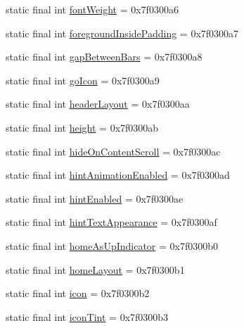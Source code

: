 \begin{DoxyCompactItemize}
\item 
static final int \mbox{\hyperlink{classandroid_1_1support_1_1design_1_1_r_1_1attr_a6a55f3eadb00895d0383f5379ef0d285}{font\+Weight}} = 0x7f0300a6
\item 
static final int \mbox{\hyperlink{classandroid_1_1support_1_1design_1_1_r_1_1attr_a133378181d31801943cf01d474253db0}{foreground\+Inside\+Padding}} = 0x7f0300a7
\item 
static final int \mbox{\hyperlink{classandroid_1_1support_1_1design_1_1_r_1_1attr_af5aa83bca46ec78627ca7af277ace09a}{gap\+Between\+Bars}} = 0x7f0300a8
\item 
static final int \mbox{\hyperlink{classandroid_1_1support_1_1design_1_1_r_1_1attr_ab0832bfcb7a264b7f160a92f19c26514}{go\+Icon}} = 0x7f0300a9
\item 
static final int \mbox{\hyperlink{classandroid_1_1support_1_1design_1_1_r_1_1attr_a669a14ce772e913e335a7e450b199e21}{header\+Layout}} = 0x7f0300aa
\item 
static final int \mbox{\hyperlink{classandroid_1_1support_1_1design_1_1_r_1_1attr_a67de67e33346463b7e8ccac5a5c3d2b8}{height}} = 0x7f0300ab
\item 
static final int \mbox{\hyperlink{classandroid_1_1support_1_1design_1_1_r_1_1attr_afad42994576791dcb844b6d5a92b106e}{hide\+On\+Content\+Scroll}} = 0x7f0300ac
\item 
static final int \mbox{\hyperlink{classandroid_1_1support_1_1design_1_1_r_1_1attr_a45965840ce51b3dc10db2c5ed7c0d923}{hint\+Animation\+Enabled}} = 0x7f0300ad
\item 
static final int \mbox{\hyperlink{classandroid_1_1support_1_1design_1_1_r_1_1attr_ab0cf90bb8161a418c2e43862ed461e28}{hint\+Enabled}} = 0x7f0300ae
\item 
static final int \mbox{\hyperlink{classandroid_1_1support_1_1design_1_1_r_1_1attr_a571b12c480a0e39c924235a502df4a7a}{hint\+Text\+Appearance}} = 0x7f0300af
\item 
static final int \mbox{\hyperlink{classandroid_1_1support_1_1design_1_1_r_1_1attr_a2cd44aad7205648aa1db17d8376012c7}{home\+As\+Up\+Indicator}} = 0x7f0300b0
\item 
static final int \mbox{\hyperlink{classandroid_1_1support_1_1design_1_1_r_1_1attr_af4fde3588c8e7ef225a4babe99fb6327}{home\+Layout}} = 0x7f0300b1
\item 
static final int \mbox{\hyperlink{classandroid_1_1support_1_1design_1_1_r_1_1attr_a3dd29517b74c4eefbf204f5f85f3788e}{icon}} = 0x7f0300b2
\item 
static final int \mbox{\hyperlink{classandroid_1_1support_1_1design_1_1_r_1_1attr_a9765bcbbf6c76cc6c4873eaa3e24d0bb}{icon\+Tint}} = 0x7f0300b3

\end{DoxyCompactItemize}

